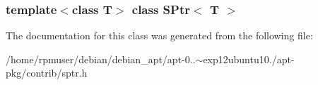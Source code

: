 \subsubsection*{template$<$class \-T$>$ class S\-Ptr$<$ T $>$}



\-The documentation for this class was generated from the following file\-:\begin{DoxyCompactItemize}
\item 
/home/rpmuser/debian/debian\-\_\-apt/apt-\/0..$\sim$exp12ubuntu10./apt-\/pkg/contrib/sptr.\-h\end{DoxyCompactItemize}
